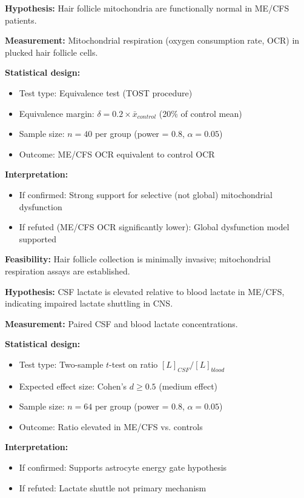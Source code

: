 \begin{prediction}
\label{pred:hair-follicle}
\textbf{Hypothesis:} Hair follicle mitochondria are functionally normal in ME/CFS patients.

\textbf{Measurement:} Mitochondrial respiration (oxygen consumption rate, OCR) in plucked hair follicle cells.

\textbf{Statistical design:}
\begin{itemize}
    \item Test type: Equivalence test (TOST procedure)
    \item Equivalence margin: $\delta = 0.2 \times \bar{x}_{control}$ (20\% of control mean)
    \item Sample size: $n = 40$ per group (power = 0.8, $\alpha = 0.05$)
    \item Outcome: ME/CFS OCR equivalent to control OCR
\end{itemize}

\textbf{Interpretation:}
\begin{itemize}
    \item If confirmed: Strong support for selective (not global) mitochondrial dysfunction
    \item If refuted (ME/CFS OCR significantly lower): Global dysfunction model supported
\end{itemize}

\textbf{Feasibility:} Hair follicle collection is minimally invasive; mitochondrial respiration assays are established.
\end{prediction}

\begin{prediction}
\label{pred:csf-lactate}
\textbf{Hypothesis:} CSF lactate is elevated relative to blood lactate in ME/CFS, indicating impaired lactate shuttling in CNS.

\textbf{Measurement:} Paired CSF and blood lactate concentrations.

\textbf{Statistical design:}
\begin{itemize}
    \item Test type: Two-sample $t$-test on ratio $[L]_{CSF}/[L]_{blood}$
    \item Expected effect size: Cohen's $d \geq 0.5$ (medium effect)
    \item Sample size: $n = 64$ per group (power = 0.8, $\alpha = 0.05$)
    \item Outcome: Ratio elevated in ME/CFS vs. controls
\end{itemize}

\textbf{Interpretation:}
\begin{itemize}
    \item If confirmed: Supports astrocyte energy gate hypothesis
    \item If refuted: Lactate shuttle not primary mechanism
\end{itemize}
\end{prediction}

